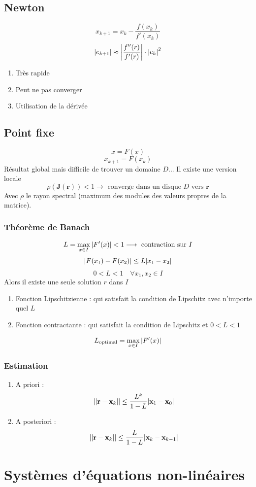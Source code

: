 \documentclass[resume]{subfiles}
\begin{document}
\subsection{Newton}
$$\boxed{x_{k+1}=x_{k}-\frac{f(x_{k})}{f'(x_{k})}}$$
$$\abs{e_{k+1}}\approx \abs{\frac{f''(r)}{f'(r)}}\cdot \abs{e_k}^2$$
\begin{enumerate}
\item Très rapide
\item Peut ne pas converger
\item Utilisation de la dérivée
\end{enumerate}
\subsection{Point fixe}
$$\boxed{x=F(x)}$$
$$x_{k+1}=F(x_k)$$
Résultat global mais difficile de trouver un domaine $D$... Il existe une version locale
$$\rho(\mathbf{J}(\mathbf{r}))<1\longrightarrow\text{ converge dans un disque } D\text{ vers }\mathbf{r}$$
Avec $\rho$ le rayon spectral (maximum des modules des valeurs propres de la matrice).
\subsubsection{Théorème de Banach}
$$L=\max_{x\in I}\abs{F'(x)}<1\longrightarrow\text{ contraction sur }I$$
$$\abs{F(x_1)-F(x_2)}\leq L\abs{x_1-x_2}$$
$$0<L<1\quad \forall x_1,x_2\in I$$
Alors il existe une seule solution $r$ dans $I$
\begin{enumerate}
\item Fonction Lipschitzienne : qui satisfait la condition de Lipschitz avec n'importe quel $L$
\item Fonction contractante : qui satisfait la condition de Lipschitz et $0<L<1$
\end{enumerate}
$$L_\text{optimal}=\max_{x\in I}\abs{F'(x)}$$
\subsubsection{Estimation}
\begin{enumerate}
\item A priori : 
$$\abs{\abs{\mathbf{r}-\mathbf{x}_k}}\leq \frac{L^{k}}{1-L}\abs{\mathbf{x}_1-\mathbf{x}_0}$$
\item A posteriori :
$$\abs{\abs{\mathbf{r}-\mathbf{x}_k}}\leq \frac{L}{1-L}\abs{\mathbf{x}_k-\mathbf{x}_{k-1}}$$
\end{enumerate}

\section{Systèmes d'équations non-linéaires}
\end{document}

